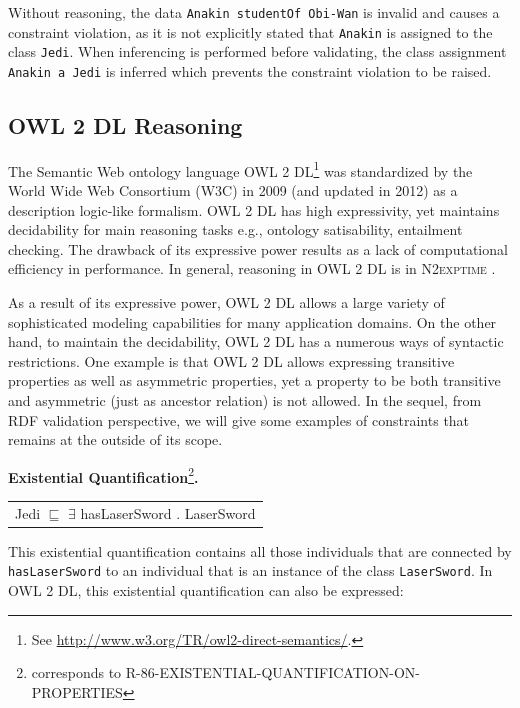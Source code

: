 \documentclass{llncs}
\newcommand{\ms}[1]{\texttt{#1}}
\newcommand{\tb}[1]{\todo[size=\small, color=green!40]{\textbf{Thomas:} #1}}
\newenvironment{DL}{
  \scriptsize
  \sffamily
  \vspace{0.3cm}
  \begin{tabular}{l}

}{
  \end{tabular}
  \linebreak
}
\begin{document}
Without reasoning, the data \ms{Anakin studentOf Obi-Wan} is invalid and causes a constraint violation, as it is not explicitly stated that \ms{Anakin} is assigned to the class \ms{Jedi}. 
When inferencing is performed before validating, the class assignment \ms{Anakin a Jedi} is inferred which prevents the constraint violation to be raised.

\subsection{OWL 2 DL Reasoning}


The Semantic Web ontology language OWL 2 DL\footnote{See \url{http://www.w3.org/TR/owl2-direct-semantics/}.} was standardized by
the World Wide Web Consortium (W3C) in 2009 (and updated in 2012) as a
description logic-like formalism.  OWL 2 DL has high expressivity, yet maintains  decidability for main reasoning tasks e.g., ontology satisability, 
entailment checking. The drawback of its expressive power results as a lack of computational efficiency in performance. In general, reasoning in OWL 2 DL is in \textsc{N2exptime} \cite{owl2profiles2008}. 

As a result of its expressive power, OWL 2 DL allows a large variety of sophisticated modeling capabilities for many application domains.  On the other hand, to maintain the decidability, OWL 2 DL has a numerous ways of syntactic restrictions. One example is that OWL 2 DL allows  expressing transitive properties as well as asymmetric properties, yet a property to be both transitive and asymmetric (just as ancestor relation) is not allowed. In the sequel, from RDF validation perspective, we will give some examples of constraints that remains at the outside of its scope. 



\textbf{Existential Quantification}\footnote{corresponds to R-86-EXISTENTIAL-QUANTIFICATION-ON-PROPERTIES}\textbf{.}

\begin{DL}
Jedi $\sqsubseteq$ $\exists$ hasLaserSword . LaserSword
\end{DL}

This existential quantification contains all those individuals that are connected by \ms{hasLaserSword} to an individual that is an instance of the class \ms{LaserSword}.
In OWL 2 DL, this existential quantification can also be expressed:
\end{document}
